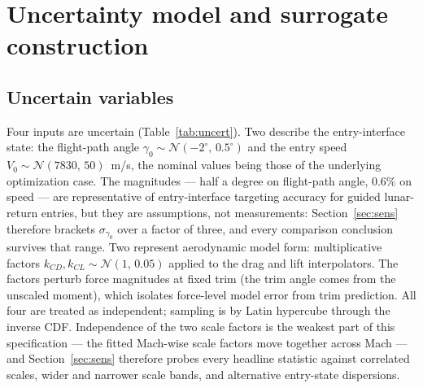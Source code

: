 \section{Uncertainty model and surrogate construction}
\label{sec:surrogate}

\subsection{Uncertain variables}
\label{sec:uncertainty}

Four inputs are uncertain (Table~\ref{tab:uncert}). Two describe the
entry-interface state: the flight-path angle
$\gamma_0\sim\mathcal{N}(-2^\circ,\,0.5^\circ)$ and the entry speed
$V_0\sim\mathcal{N}(7830,\,50)$~m/s, the nominal values being those of the
underlying optimization case. The magnitudes --- half a degree on
flight-path angle, 0.6\% on speed --- are representative of
entry-interface targeting accuracy for guided lunar-return entries, but
they are assumptions, not measurements: Section~\ref{sec:sens} therefore
brackets $\sigma_{\gamma_0}$ over a factor of three, and every comparison
conclusion survives that range. Two represent aerodynamic model form:
multiplicative factors $k_{CD},k_{CL}\sim\mathcal{N}(1,\,0.05)$ applied to
the drag and lift interpolators. The factors perturb force magnitudes at
fixed trim (the trim angle comes from the unscaled moment), which isolates
force-level model error from trim prediction. All four are treated as
independent; sampling is by Latin hypercube through the inverse CDF.
Independence of the two scale factors is the weakest part of this
specification --- the fitted Mach-wise scale factors move together across
Mach --- and Section~\ref{sec:sens} therefore probes every headline
statistic against correlated scales, wider and narrower scale bands, and
alternative entry-state dispersions.

